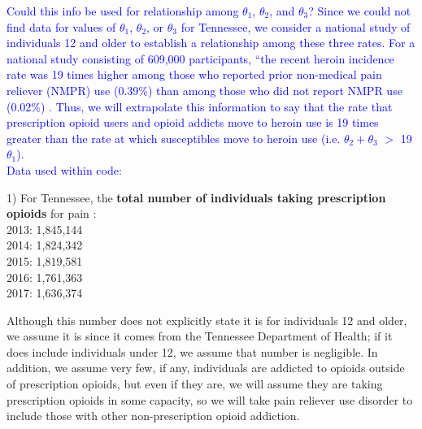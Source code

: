 \documentclass[12pt]{article}
\begin{document}
 \textcolor{blue}{Could this info be used for relationship among $\theta_1$, $\theta_2$, and $\theta_3$? Since we could not find data for values of $\theta_1$, $\theta_2$, or $\theta_3$ for Tennessee, we consider a national study of individuals 12 and older to establish a relationship among these three rates. For a national study consisting of 609,000 participants, ``the recent heroin incidence rate was 19 times higher among those who reported prior non-medical pain reliever (NMPR) use (0.39\%) than among those who did not report NMPR use (0.02\%) \cite{Muhuri}.
Thus, we will extrapolate this information to say that the rate that prescription opioid users and opioid addicts move to heroin use is 19 times greater than the rate at which susceptibles move to heroin use (i.e. $\theta_2 + \theta_3$ $>$ 19$\theta_1$).} \\
 
 \textcolor{blue}{Data used within code:} 
 
1) For Tennessee, the \textbf{total number of individuals taking prescription opioids} for pain \cite{TNgov1}: \\
2013: 1,845,144 \\
2014: 1,824,342 \\
2015: 1,819,581 \\
2016: 1,761,363 \\
2017: 1,636,374 

Although this number does not explicitly state it is for individuals 12 and older, we assume it is since it comes from the Tennessee Department of Health; if it does include individuals under 12, we assume that number is negligible. In addition, we assume very few, if any, individuals are addicted to opioids outside of prescription opioids, but even if they are, we will assume they are taking prescription opioids in some capacity, so we will take pain reliever use disorder to include those with other non-prescription opioid addiction. \\
\end{document}
